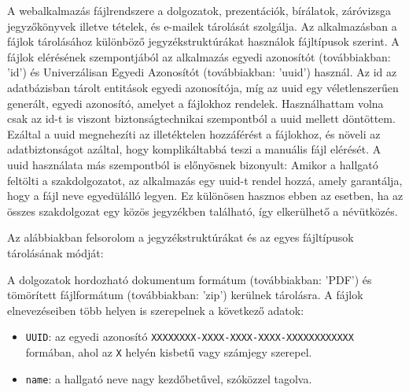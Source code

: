 
A webalkalmazás fájlrendszere a dolgozatok, prezentációk, bírálatok, záróvizsga jegyzőkönyvek illetve tételek, és e-mailek tárolását szolgálja. Az alkalmazásban a fájlok tárolásához különböző jegyzékstruktúrákat használok  fájltípusok szerint. A fájlok elérésének szempontjából az alkalmazás egyedi azonosítót (továbbiakban: 'id') és Univerzálisan Egyedi Azonosítót (továbbiakban: 'uuid') használ. Az id az adatbázisban tárolt entitások egyedi azonosítója, míg az uuid egy véletlenszerűen generált, egyedi azonosító, amelyet a fájlokhoz rendelek. Használhattam volna csak az id-t is viszont biztonságtechnikai szempontból a uuid mellett döntöttem. Ezáltal a uuid megnehezíti az illetéktelen hozzáférést a fájlokhoz, és növeli az adatbiztonságot azáltal, hogy komplikáltabbá teszi a manuális fájl elérését. A uuid használata más szempontból is előnyösnek bizonyult: Amikor a hallgató feltölti a szakdolgozatot, az alkalmazás egy uuid-t rendel hozzá, amely garantálja, hogy a fájl neve egyedülálló legyen. Ez különösen hasznos ebben az esetben, ha az összes szakdolgozat egy közös jegyzékben található, így elkerülhető a névütközés.

Az alábbiakban felsorolom a jegyzékstruktúrákat és az egyes fájltípusok tárolásának módját:

A dolgozatok hordozható dokumentum formátum (továbbiakban: 'PDF') és tömörített fájlformátum (továbbiakban: 'zip') kerülnek tárolásra. A fájlok elnevezéseiben több helyen is szerepelnek a következő adatok:

\begin{itemize}
\item \texttt{UUID}: az egyedi azonosító \texttt{XXXXXXXX-XXXX-XXXX-XXXX-XXXXXXXXXXXX} formában, ahol az \texttt{X} helyén kisbetű vagy számjegy szerepel.

\item \texttt{name}: a hallgató neve nagy kezdőbetűvel, szóközzel tagolva.
\end{itemize}

